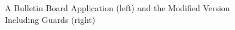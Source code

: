 \begin{figure}[t!]
    \centering
    \begin{subfigure}[b]{0.48\textwidth} 
       \label{fig:app1}
    \end{subfigure} ~
       \begin{subfigure}[b]{0.52\textwidth} 
        \label{fig:app2}
    \end{subfigure}\\
    \hrulefill
    \caption{A Bulletin Board Application (left) and the Modified Version Including Guards (right) }
\end{figure}
